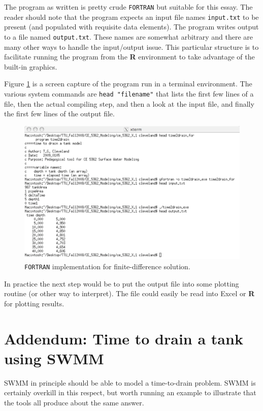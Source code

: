 \documentclass[12pt]{article}
\begin{document}
The program as written is pretty crude \texttt{FORTRAN} but suitable for this essay.  The reader should note that the program expects an input file names \texttt{input.txt} to be present (and populated with requisite data elements).  The program writes output to a file named \texttt{output.txt}.  These names are somewhat arbitrary and there are many other ways to handle the input/output issue.  This particular structure is to facilitate running the program from the \textbf{R} environment to take advantage of the built-in graphics.

Figure \ref{fig:fortranSC.pdf} is a screen capture of the program run in a terminal environment.  The various system commands are \texttt{head "filename"} that lists the first few lines of a file, then the actual compiling step, and then a look at the input file, and finally the first few lines of the output file.

\begin{figure}[htbp] %
   \centering
   \includegraphics[width=6.5in]{fortranSC.pdf} 
   \caption{\texttt{FORTRAN} implementation for finite-difference solution.}
   \label{fig:fortranSC.pdf}
\end{figure}

In practice the next step would be to put the output file into some plotting routine (or other way to interpret).  The file could easily be read into Excel or \textbf{R} for plotting results.

\newpage

\section{Addendum: Time to drain a tank using SWMM}
SWMM in principle should be able to model a time-to-drain problem.  SWMM is certainly overkill in this respect, but worth running an example to illustrate that the tools all produce about the same answer.
\end{document}

